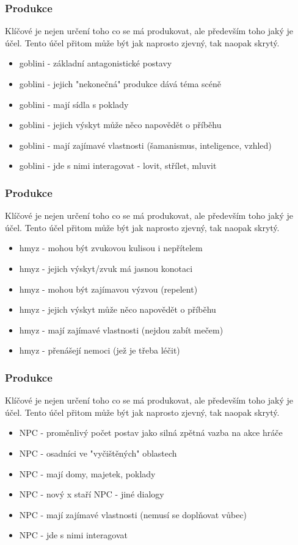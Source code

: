 ﻿\documentclass[a4paper]{beamer}
\begin{document}
\begin{frame}
\frametitle{Produkce}

Klíčové je nejen určení toho co se má produkovat, ale především toho jaký je účel.
\vfill
Tento účel přitom může být jak naprosto zjevný, tak naopak skrytý.

\begin{itemize}
    \item goblini - základní antagonistické postavy
    \item goblini - jejich "nekonečná" produkce dává téma scéně
    \item goblini - mají sídla s poklady
    \item goblini - jejich výskyt může něco napovědět o příběhu
    \item goblini - mají zajímavé vlastnosti (šamanismus, inteligence, vzhled)    
    \item goblini - jde s nimi interagovat - lovit, střílet, mluvit
\end{itemize}
\end{frame}

\begin{frame}
\frametitle{Produkce}

Klíčové je nejen určení toho co se má produkovat, ale především toho jaký je účel.
\vfill
Tento účel přitom může být jak naprosto zjevný, tak naopak skrytý.

\begin{itemize}
    \item hmyz - mohou být zvukovou kulisou i nepřítelem
    \item hmyz - jejich výskyt/zvuk má jasnou konotaci
    \item hmyz - mohou být zajímavou výzvou (repelent)
    \item hmyz - jejich výskyt může něco napovědět o příběhu
    \item hmyz - mají zajímavé vlastnosti (nejdou zabít mečem)    
    \item hmyz - přenášejí nemoci (jež je třeba léčit)
\end{itemize}
\end{frame}

\begin{frame}
\frametitle{Produkce}

Klíčové je nejen určení toho co se má produkovat, ale především toho jaký je účel.
\vfill
Tento účel přitom může být jak naprosto zjevný, tak naopak skrytý.

\begin{itemize}
    \item NPC - proměnlivý počet postav jako silná zpětná vazba na akce hráče
    \item NPC - osadníci ve "vyčištěných" oblastech
    \item NPC - mají domy, majetek, poklady
    \item NPC - nový x staří NPC - jiné dialogy
    \item NPC - mají zajímavé vlastnosti (nemusí se doplňovat vůbec)    
    \item NPC - jde s nimi interagovat 
\end{itemize}
\end{frame}
\end{document}
